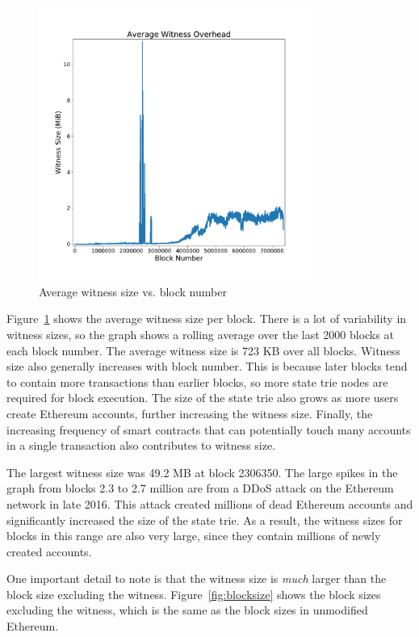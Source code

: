 \documentclass[12pt]{article}
\begin{document}
\begin{figure}[H]
  \centering
  \includegraphics[width=0.8\textwidth]{../figures/results/graphs/background/witness-size.pdf}
  \caption{Average witness size vs. block number}
  \label{fig:witnesssize}
\end{figure}

Figure~\ref{fig:witnesssize} shows the average witness size per block. There is a lot of variability in witness sizes, so the graph shows a rolling average over the last 2000 blocks at each block number. The average witness size is 723 KB over all blocks. Witness size also generally increases with block number. This is because later blocks tend to contain more transactions than earlier blocks, so more state trie nodes are required for block execution. The size of the state trie also grows as more users create Ethereum accounts, further increasing the witness size. Finally, the increasing frequency of smart contracts that can potentially touch many accounts in a single transaction also contributes to witness size.

The largest witness size was 49.2 MB at block 2306350. The large spikes in the graph from blocks 2.3 to 2.7 million are from a DDoS attack on the Ethereum network in late 2016. This attack created millions of dead Ethereum accounts and significantly increased the size of the state trie. As a result, the witness sizes for blocks in this range are also very large, since they contain millions of newly created accounts.

One important detail to note is that the witness size is \emph{much} larger than the block size excluding the witness. Figure~\ref{fig:blocksize} shows the block sizes excluding the witness, which is the same as the block sizes in unmodified Ethereum.
\end{document}
